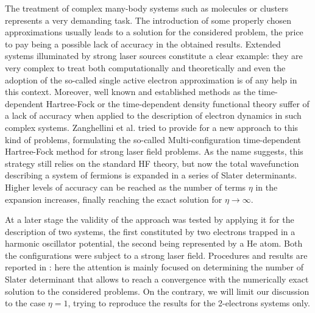 The treatment of complex many-body systems such as molecules or clusters represents a very demanding task. The introduction of some properly chosen approximations usually leads to a solution for the considered problem, the price to pay being a possible lack of accuracy in the obtained results. Extended systems illuminated by strong laser sources constitute a clear example: they are very complex to treat both computationally and theoretically and even the adoption of the so-called single active electron approximation is of any help in this context. Moreover, well known and established methods as the time-dependent Hartree-Fock or the time-dependent density functional theory suffer of a lack of accuracy when applied to the description of electron dynamics in such complex systems. Zanghellini et al. tried to provide for a new approach \cite{Zangellini_2003} to this kind of problems, formulating the so-called Multi-configuration time-dependent Hartree-Fock method for strong laser field problems. As the name suggests, this strategy still relies on the standard HF theory, but now the total wavefunction describing a system of fermions is expanded in a series of Slater determinants. Higher levels of accuracy can be reached as the number of terms $\eta$ in the expansion increases, finally reaching the exact solution for $\eta \rightarrow \infty$. 

At a later stage the validity of the approach was tested by applying it for the description of two systems, the first constituted by two electrons trapped in a harmonic oscillator potential, the second being represented by a He atom. Both the configurations were subject to a strong laser field. Procedures and results are reported in \cite{Zanghellini_2004}: here the attention is mainly focused on determining the number of Slater determinant that allows to reach a convergence with the numerically exact solution to the considered problems. On the contrary, we will limit our discussion to the case $\eta=1$, trying to reproduce the results for the 2-electrons systems only.

